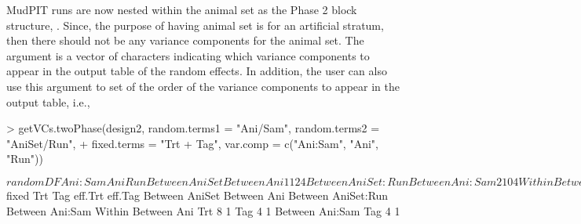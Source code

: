 \documentclass[article]{jss}
\begin{document}
MudPIT runs are now nested within the animal set as the Phase 2 block structure, . Since, the purpose of having animal set is for an artificial stratum, then there should not be any variance components for the animal set. The  argument is a vector of characters indicating which variance components to appear in the output table of the random effects. In addition, the user can also use this argument to set of the order of the variance components to appear in the output table, i.e.,
\begin{CodeChunk}
\begin{CodeInput}
> getVCs.twoPhase(design2, random.terms1 = "Ani/Sam", random.terms2 = "AniSet/Run", 
+ fixed.terms = "Trt + Tag", var.comp = c("Ani:Sam", "Ani", "Run"))                                    
\end{CodeInput}
\begin{CodeOutput}
$random
                   DF Ani:Sam Ani Run
Between AniSet                       
   Between Ani     1  1       2   4  
Between AniSet:Run                   
   Between Ani:Sam 2  1       0   4  
Within                               
   Between Ani                       
      Trt          1  1       2   0  
      Tag          1  1       2   0  
      Residual     4  1       2   0  
   Between Ani:Sam                   
      Tag          2  1       0   0  
      Residual     4  1       0   0  

$fixed
                   Trt Tag eff.Trt eff.Tag
Between AniSet                            
  Between Ani                             
Between AniSet:Run                        
  Between Ani:Sam                         
Within                                    
  Between Ani                             
   Trt             8       1              
   Tag                 4           1      
  Between Ani:Sam                         
   Tag                 4           1      
\end{CodeOutput}
\end{CodeChunk}
\end{document}
